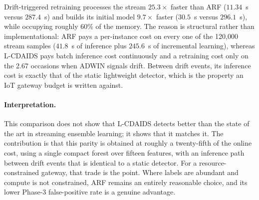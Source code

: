 \documentclass[11pt,a4paper]{article}
\begin{document}
\begin{table}[!ht]
\centering
\caption{Computational cost on the 120{,}000-sample stream (mean over
three seeds, single-threaded). Stream processing includes everything the
method must do online: inference for all models, plus ADWIN monitoring
and retraining for the drift-triggered model, plus per-instance learning
for ARF.}
\label{tab:cost}
\small
{}
\end{table}

Drift-triggered retraining processes the stream $25.3\times$ faster than
ARF ($11.34$~s versus $287.4$~s) and builds its initial model
$9.7\times$ faster ($30.5$~s versus $296.1$~s), while occupying roughly
60\% of the memory. The reason is structural rather than
implementational: ARF pays a per-instance cost on every one of the
120{,}000 stream samples ($41.8$~s of inference plus $245.6$~s of
incremental learning), whereas L-CDAIDS pays batch inference cost
continuously and a retraining cost only on the 2.67 occasions when ADWIN
signals drift. Between drift events, its inference cost is exactly that
of the static lightweight detector, which is the property an IoT gateway
budget is written against.

\paragraph{Interpretation.} This comparison does not show that
L-CDAIDS detects better than the state of the art in streaming ensemble
learning; it shows that it matches it. The contribution is that this
parity is obtained at roughly a twenty-fifth of the online cost, using a
single compact forest over fifteen features, with an inference path
between drift events that is identical to a static detector. For a
resource-constrained gateway, that trade is the point. Where labels are
abundant and compute is not constrained, ARF remains an entirely
reasonable choice, and its lower Phase-3 false-positive rate is a
genuine advantage.
\end{document}
